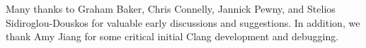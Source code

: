 

Many thanks to Graham Baker, Chris Connelly, Jannick Pewny, and Stelios Sidiroglou-Douskos for valuable early discussions and suggestions.  
In addition, we thank Amy Jiang for some critical initial Clang development and debugging.

